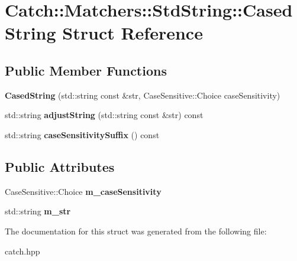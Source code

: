 \hypertarget{structCatch_1_1Matchers_1_1StdString_1_1CasedString}{}\section{Catch\+:\+:Matchers\+:\+:Std\+String\+:\+:Cased\+String Struct Reference}
\label{structCatch_1_1Matchers_1_1StdString_1_1CasedString}
\subsection*{Public Member Functions}
\begin{DoxyCompactItemize}
\item 
{\bfseries Cased\+String} (std\+::string const \&str, Case\+Sensitive\+::\+Choice case\+Sensitivity)\hypertarget{structCatch_1_1Matchers_1_1StdString_1_1CasedString_aa88bbc5acd2bff22351d8d4b1816b561}{}\label{structCatch_1_1Matchers_1_1StdString_1_1CasedString_aa88bbc5acd2bff22351d8d4b1816b561}

\item 
std\+::string {\bfseries adjust\+String} (std\+::string const \&str) const \hypertarget{structCatch_1_1Matchers_1_1StdString_1_1CasedString_a0ff84e194426c8f4bca0660b9180d20d}{}\label{structCatch_1_1Matchers_1_1StdString_1_1CasedString_a0ff84e194426c8f4bca0660b9180d20d}

\item 
std\+::string {\bfseries case\+Sensitivity\+Suffix} () const \hypertarget{structCatch_1_1Matchers_1_1StdString_1_1CasedString_a1113c80dd02967032a99290bdcd1b590}{}\label{structCatch_1_1Matchers_1_1StdString_1_1CasedString_a1113c80dd02967032a99290bdcd1b590}

\end{DoxyCompactItemize}
\subsection*{Public Attributes}
\begin{DoxyCompactItemize}
\item 
Case\+Sensitive\+::\+Choice {\bfseries m\+\_\+case\+Sensitivity}\hypertarget{structCatch_1_1Matchers_1_1StdString_1_1CasedString_ae1c2864c986941536a6e94cca0528f92}{}\label{structCatch_1_1Matchers_1_1StdString_1_1CasedString_ae1c2864c986941536a6e94cca0528f92}

\item 
std\+::string {\bfseries m\+\_\+str}\hypertarget{structCatch_1_1Matchers_1_1StdString_1_1CasedString_ad05dbc99aba3c3c386d6b856b213f911}{}\label{structCatch_1_1Matchers_1_1StdString_1_1CasedString_ad05dbc99aba3c3c386d6b856b213f911}

\end{DoxyCompactItemize}


The documentation for this struct was generated from the following file\+:\begin{DoxyCompactItemize}
\item 
catch.\+hpp\end{DoxyCompactItemize}
